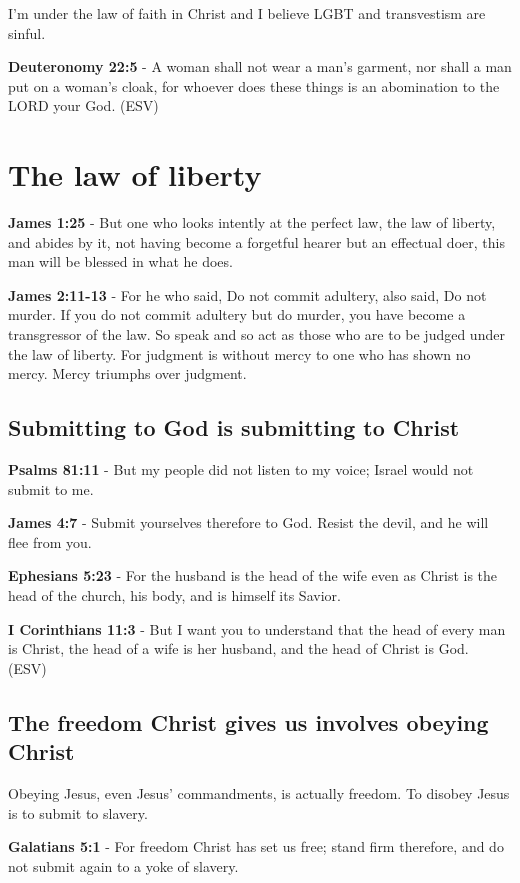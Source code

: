 \documentclass[11pt]{article}
\begin{document}
I'm under the law of faith in Christ and I believe
LGBT and transvestism are sinful.

\textbf{Deuteronomy 22:5} - A woman shall not wear a man's garment, nor shall a man put on a woman's cloak, for whoever does these things is an abomination to the LORD your God. (ESV)

\section{The law of liberty}
\label{sec:org7ee3693}
\textbf{James 1:25} - But one who looks intently at the perfect law, the law of liberty, and abides by it, not having become a forgetful hearer but an effectual doer, this man will be blessed in what he does.

\textbf{James 2:11-13} - For he who said, Do not commit adultery, also said, Do not murder. If you do not commit adultery but do murder, you have become a transgressor of the law.  So speak and so act as those who are to be judged under the law of liberty.  For judgment is without mercy to one who has shown no mercy. Mercy triumphs over judgment.

\subsection{Submitting to God is submitting to Christ}
\label{sec:org852bf8c}
\textbf{Psalms 81:11} - But my people did not listen to my voice; Israel would not submit to me.

\textbf{James 4:7} - Submit yourselves therefore to God. Resist the devil, and he will flee from you.

\textbf{Ephesians 5:23} - For the husband is the head of the wife even as Christ is the head of the church, his body, and is himself its Savior.

\textbf{I Corinthians 11:3} - But I want you to understand that the head of every man is Christ, the head of a wife is her husband, and the head of Christ is God. (ESV)

\subsection{The freedom Christ gives us involves obeying Christ}
\label{sec:org9583208}

Obeying Jesus, even Jesus' commandments, is actually freedom. To disobey Jesus is to submit to slavery.

\textbf{Galatians 5:1} - For freedom Christ has set us free; stand firm therefore, and do not submit again to a yoke of slavery.
\end{document}
